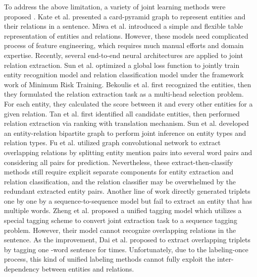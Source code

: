 \documentclass{ecai}
\begin{document}
To address the above limitation, a variety of joint learning methods were proposed \cite{gupta2016table,katiyar2017going,li2019entity,takanobu2019hierarchical,zhang2017end}. 
Kate et al. \cite{kate2010joint} presented a card-pyramid graph to represent entities and their relations in a sentence.
Miwa et al. \cite{miwa2014modeling} introduced a simple and flexible table representation of entities and relations.
However, these models need complicated process of feature engineering, which requires much manual efforts and domain expertise. 
Recently, several end-to-end neural architectures are applied to joint relation extraction.
Sun et al. \cite{sun2018extracting} optimized a global loss function to jointly train entity recognition model and relation classification model under the framework work of Minimum Risk Training.
Bekoulis et al. \cite{bekoulis2018adversarial,bekoulis2018joint} first recognized the entities, then they formulated the relation extraction task as a multi-head selection problem. For each entity, they calculated the score between it and every other entities for a given relation.
Tan et al. \cite{tan2019jointly} first identified all candidate entities, then performed relation extraction via ranking with translation mechanism.
Sun et al. \cite{sun2019joint} developed an entity-relation bipartite graph to perform joint inference on entity types and relation types. 
Fu et al. \cite{fu-etal-2019-graphrel} utilized graph convolutional network to extract overlapping relations by splitting entity mention pairs into several word pairs and considering all pairs for prediction.
Nevertheless, these extract-then-classify methods still require explicit separate components for entity extraction and relation classification, and the relation classifier may be overwhelmed by the redundant extracted entity pairs.
Another line of work \cite{zeng-etal-2019-learning,zeng2018extracting} directly generated triplets one by one by a sequence-to-sequence model but fail to extract an entity that has multiple words.
Zheng et al. \cite{zheng2017joint} proposed a unified tagging model which utilizes a special tagging scheme to convert joint extraction task to a sequence tagging problem. However, their model cannot recognize overlapping relations in the sentence.
As the improvement, Dai et al. \cite{dai2019joint} proposed to extract overlapping triplets by tagging one -word sentence for  times. 
Unfortunately, due to the labeling-once process, this kind of unified labeling methods cannot fully exploit the inter-dependency between entities and relations.
\end{document}
